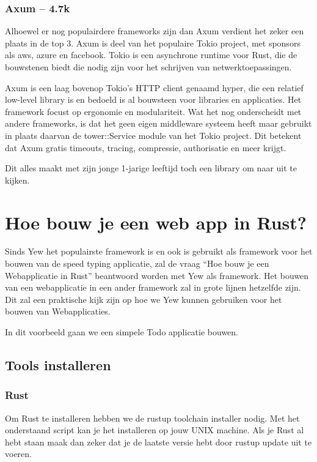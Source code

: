 \clearpage

\subsubsection{Axum – 4.7k}

Alhoewel er nog populairdere frameworks zijn dan Axum verdient het zeker een plaats in de top 3.
Axum is deel van het populaire Tokio project, met sponsors als aws, azure en facebook. Tokio is een
asynchrone runtime voor Rust, die de bouwstenen biedt die nodig zijn voor het schrijven van
netwerktoepassingen. 

Axum is een laag bovenop Tokio’s HTTP client genaamd hyper, die een relatief low-level library is en
bedoeld is al bouwsteen voor libraries en applicaties. Het framework focust op ergonomie en
modulariteit. Wat het nog onderscheidt met andere frameworks, is dat het geen eigen middleware
systeem heeft maar gebruikt in plaats daarvan de tower::Service module van het Tokio project. Dit
betekent dat Axum gratis timeouts, tracing, compressie, authorisatie en meer krijgt. 

Dit alles maakt met zijn jonge 1-jarige leeftijd toch een library om naar uit te kijken. 

\section{Hoe bouw je een web app in Rust?}

Sinds Yew het populairste framework is en ook is gebruikt als framework voor het bouwen van de speed
typing applicatie, zal de vraag \enquote{Hoe bouw je een Webapplicatie in Rust} beantwoord worden met Yew
als framework. Het bouwen van een webapplicatie in een ander framework zal in grote lijnen hetzelfde
zijn. Dit zal een praktische kijk zijn op hoe we Yew kunnen gebruiken voor het bouwen van
Webapplicaties.  

In dit voorbeeld gaan we een simpele Todo applicatie bouwen.

\subsection{Tools installeren}

\subsubsection{Rust}
Om Rust te installeren hebben we de rustup toolchain installer nodig. Met het onderstaand script kan
je het installeren op jouw UNIX machine. Als je Rust al hebt staan maak dan zeker dat je de laatste
versie hebt door rustup update uit te voeren.

